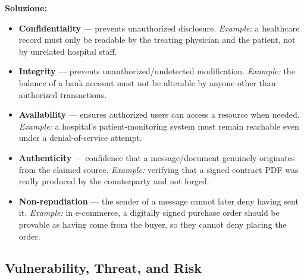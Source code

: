 \documentclass[12pt, a4paper]{article}
\begin{document}
\textbf{Soluzione:}
\begin{itemize}
    \item \textbf{Confidentiality} — prevents unauthorized disclosure. \emph{Example:} a healthcare record must only be readable by the treating physician and the patient, not by unrelated hospital staff.
    \item \textbf{Integrity} — prevents unauthorized/undetected modification. \emph{Example:} the balance of a bank account must not be alterable by anyone other than authorized transactions.
    \item \textbf{Availability} — ensures authorized users can access a resource when needed. \emph{Example:} a hospital's patient-monitoring system must remain reachable even under a denial-of-service attempt.
    \item \textbf{Authenticity} — confidence that a message/document genuinely originates from the claimed source. \emph{Example:} verifying that a signed contract PDF was really produced by the counterparty and not forged.
    \item \textbf{Non-repudiation} — the sender of a message cannot later deny having sent it. \emph{Example:} in e-commerce, a digitally signed purchase order should be provable as having come from the buyer, so they cannot deny placing the order.
\end{itemize}

\subsection{Vulnerability, Threat, and Risk}
\end{document}
